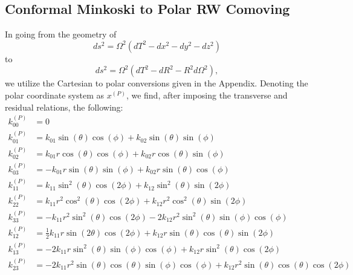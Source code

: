 \documentclass[10pt,letterpaper]{article}
\begin{document}
\subsection*{Conformal Minkoski to Polar RW Comoving}
In going from the geometry of 
\begin{equation}
ds^2 = \Omega^2(dT^2 - dx^2-dy^2-dz^2)
\end{equation}
to
\begin{equation}
ds^2 = \Omega^2 (dT^2-dR^2 - R^2 d\Omega^2),
\end{equation}
we utilize the Cartesian to polar conversions given in the Appendix. Denoting the polar coordinate system as $x^{(P)}$, we find, after imposing the transverse and residual relations, the following:
\begin{align}
k^{(P)}_{00} &= 0\nonumber\\
k^{(P)}_{01} &= k_{01} \sin (\theta ) \cos (\phi )+k_{02} \sin (\theta ) \sin (\phi )\nonumber\\
k^{(P)}_{02} &= k_{01} r \cos (\theta ) \cos (\phi )+k_{02} r \cos (\theta ) \sin (\phi )\nonumber\\
k^{(P)}_{03} &= -k_{01} r \sin (\theta ) \sin (\phi )+k_{02} r \sin (\theta ) \cos (\phi )\nonumber\\
k^{(P)}_{11} &= k_{11} \sin ^2(\theta ) \cos (2 \phi )+k_{12} \sin ^2(\theta ) \sin (2 \phi )\nonumber\\
k^{(P)}_{22} &= k_{11} r^2 \cos ^2(\theta ) \cos (2 \phi )+k_{12} r^2 \cos ^2(\theta ) \sin (2 \phi )\nonumber\\
k^{(P)}_{33} &= -k_{11} r^2 \sin ^2(\theta ) \cos (2 \phi )-2 k_{12} r^2 \sin ^2(\theta ) \sin (\phi ) \cos (\phi )\nonumber\\
k^{(P)}_{12} &= \frac{1}{2} k_{11} r \sin (2 \theta ) \cos (2 \phi )+k_{12} r \sin (\theta ) \cos (\theta ) \sin (2 \phi )\nonumber\\
k^{(P)}_{13} &=-2 k_{11} r \sin ^2(\theta ) \sin (\phi ) \cos (\phi )+ k_{12} r \sin ^2(\theta ) \cos (2 \phi )\nonumber\\
k^{(P)}_{23} &= -2 k_{11} r^2 \sin (\theta ) \cos (\theta ) \sin (\phi ) \cos (\phi )+k_{12} r^2 \sin (\theta ) \cos (\theta ) \cos (2 \phi )
\end{align}
\end{document}
